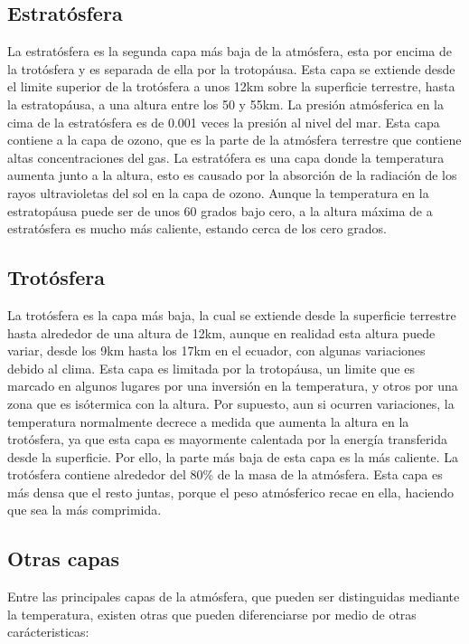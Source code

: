 \documentclass{article}
\begin{document}
\subsection {Estratósfera}
La estratósfera es la segunda capa más baja de la atmósfera, esta por encima de la trotósfera y es  separada de ella por la trotopáusa. Esta capa se extiende desde el limite superior de la trotósfera a unos 12km sobre la superficie terrestre, hasta la estratopáusa, a una altura entre los 50 y 55km.
La presión atmósferica en la cima de la estratósfera es de 0.001 veces la presión al nivel del mar. Esta capa contiene a la capa de ozono, que es la parte de la atmósfera terrestre que contiene altas concentraciones del gas. La estratófera es una capa donde la temperatura aumenta junto a la altura, esto es causado por la absorción de la radiación de los rayos ultravioletas del sol en la capa de ozono. Aunque la temperatura en la estratopáusa puede ser de unos 60 grados bajo cero, a la altura máxima de a estratósfera es mucho más caliente, estando cerca de los cero grados.

\subsection {Trotósfera}
La trotósfera es la capa más baja, la cual se extiende desde la superficie terrestre hasta alrededor de una altura de 12km, aunque en realidad esta altura puede variar, desde los 9km hasta los 17km en el ecuador, con algunas variaciones debido al clima. Esta capa es limitada por la trotopáusa, un limite que es marcado en algunos lugares por una inversión en la temperatura, y otros por una zona que es isótermica con la altura.
Por supuesto, aun si ocurren variaciones, la temperatura normalmente decrece a medida que aumenta la altura en la trotósfera, ya que esta capa es mayormente calentada por la energía transferida desde la superficie. Por ello, la parte más baja de esta capa es la más caliente.
La trotósfera contiene alrededor del 80\% de la masa de la atmósfera. Esta capa es más densa que el resto juntas, porque el peso atmósferico recae en ella, haciendo que sea la más comprimida.

\subsection {Otras capas}
Entre las principales capas de la atmósfera, que pueden ser distinguidas mediante la temperatura, existen otras que pueden diferenciarse por medio de otras carácteristicas:
\end{document}
